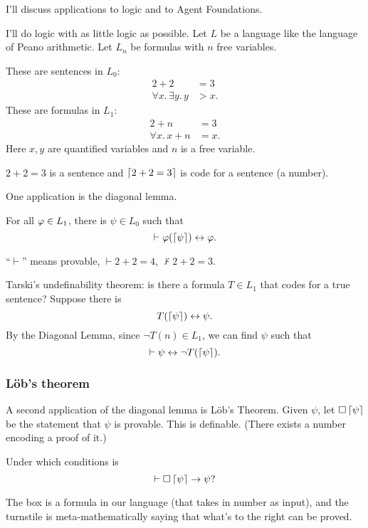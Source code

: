 \documentclass[11pt]{article}
\begin{document}
I'll discuss applications to logic and to Agent Foundations.

I'll do logic with as little logic as possible. Let $L$ be a language like the language of Peano arithmetic. Let $L_n$ be formulas with $n$ free variables.

These are sentences in $L_0$:
\begin{align}
2+2&=3\\
\forall x.\, \exists y.\, y&>x.
\end{align}
These are formulas in $L_1$:
\begin{align}
2+n&=3\\
\forall x.\, x+n&=x.
\end{align}
Here $x,y$ are quantified variables and $n$ is a free variable.

$2+2=3$ is a sentence and $\left\lceil {2+2=3}\right\rceil$ is code for a sentence (a number).

One application is the diagonal lemma.
\begin{lem}
For all $\varphi\in L_1$, there is $\psi\in L_0$ such that 
$$
\vdash\varphi(\left\lceil {\psi}\right\rceil) \leftrightarrow \varphi.
$$
\end{lem}
``$\vdash$'' means provable, $\vdash 2+2=4$, $\not\vdash 2+2=3$.


Tarski's undefinability theorem: is there a formula $T\in L_1$ that codes for a true sentence? Suppose there is
$$
T(\left\lceil {\psi}\right\rceil) \leftrightarrow \psi.
$$
By the Diagonal Lemma, since $\neg T(n)\in L_1$, we can find $\psi$ such that 
$$
\vdash \psi \leftrightarrow \neg T(\left\lceil {\psi}\right\rceil).
$$

\subsubsection{L\"ob's theorem}

A second application of the diagonal lemma is L\"ob's Theorem. Given $\psi$, let $\square \left\lceil {\psi}\right\rceil$ be the statement that $\psi$ is provable. This is definable. (There exists a number encoding a proof of it.)

Under which conditions is 
$$
\vdash \square \left\lceil {\psi}\right\rceil \to \psi?
$$

The box is a formula in our language (that takes in number as input), and the turnstile is meta-mathematically saying that what's to the right can be proved. 
\end{document}

